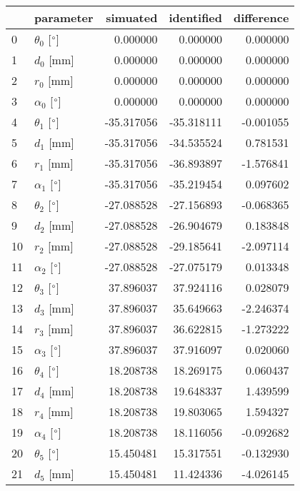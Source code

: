 \documentclass{standalone}%
\begin{document}
%
\normalsize%
\begin{tabular}{llrrr}
\toprule
{} &                 parameter &   simuated & identified & difference \\
\midrule
0  &  $\theta_{0}$ [$\degree$] &   0.000000 &   0.000000 &   0.000000 \\
1  &              $d_{0}$ [mm] &   0.000000 &   0.000000 &   0.000000 \\
2  &              $r_{0}$ [mm] &   0.000000 &   0.000000 &   0.000000 \\
3  &  $\alpha_{0}$ [$\degree$] &   0.000000 &   0.000000 &   0.000000 \\
4  &  $\theta_{1}$ [$\degree$] & -35.317056 & -35.318111 &  -0.001055 \\
5  &              $d_{1}$ [mm] & -35.317056 & -34.535524 &   0.781531 \\
6  &              $r_{1}$ [mm] & -35.317056 & -36.893897 &  -1.576841 \\
7  &  $\alpha_{1}$ [$\degree$] & -35.317056 & -35.219454 &   0.097602 \\
8  &  $\theta_{2}$ [$\degree$] & -27.088528 & -27.156893 &  -0.068365 \\
9  &              $d_{2}$ [mm] & -27.088528 & -26.904679 &   0.183848 \\
10 &              $r_{2}$ [mm] & -27.088528 & -29.185641 &  -2.097114 \\
11 &  $\alpha_{2}$ [$\degree$] & -27.088528 & -27.075179 &   0.013348 \\
12 &  $\theta_{3}$ [$\degree$] &  37.896037 &  37.924116 &   0.028079 \\
13 &              $d_{3}$ [mm] &  37.896037 &  35.649663 &  -2.246374 \\
14 &              $r_{3}$ [mm] &  37.896037 &  36.622815 &  -1.273222 \\
15 &  $\alpha_{3}$ [$\degree$] &  37.896037 &  37.916097 &   0.020060 \\
16 &  $\theta_{4}$ [$\degree$] &  18.208738 &  18.269175 &   0.060437 \\
17 &              $d_{4}$ [mm] &  18.208738 &  19.648337 &   1.439599 \\
18 &              $r_{4}$ [mm] &  18.208738 &  19.803065 &   1.594327 \\
19 &  $\alpha_{4}$ [$\degree$] &  18.208738 &  18.116056 &  -0.092682 \\
20 &  $\theta_{5}$ [$\degree$] &  15.450481 &  15.317551 &  -0.132930 \\
21 &              $d_{5}$ [mm] &  15.450481 &  11.424336 &  -4.026145 \\

\end{tabular}
\end{document}
